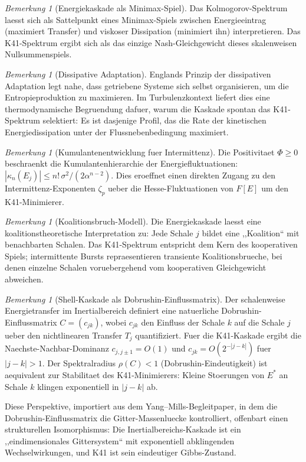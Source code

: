 \documentclass[12pt,a4paper]{article}
\theoremstyle{definition}
\theoremstyle{plain}
\theoremstyle{remark}
\newtheorem{remark}[definition]{Bemerkung}
\begin{document}
\begin{remark}[Energiekaskade als Minimax-Spiel]
Das Kolmogorov-Spektrum laesst sich als Sattelpunkt eines Minimax-Spiels zwischen Energieeintrag (maximiert Transfer) und viskoser Dissipation (minimiert ihn) interpretieren. Das K41-Spektrum ergibt sich als das einzige Nash-Gleichgewicht dieses skalenweisen Nullsummenspiels.
\end{remark}

\begin{remark}[Dissipative Adaptation]
Englands Prinzip der dissipativen Adaptation legt nahe, dass getriebene Systeme sich selbst organisieren, um die Entropieproduktion zu maximieren. Im Turbulenzkontext liefert dies eine thermodynamische Begruendung dafuer, warum die Kaskade spontan das K41-Spektrum selektiert: Es ist dasjenige Profil, das die Rate der kinetischen Energiedissipation unter der Flussnebenbedingung maximiert.
\end{remark}

\begin{remark}[Kumulantenentwicklung fuer Intermittenz]
Die Positivitaet $\Phi \geq 0$ beschraenkt die Kumulantenhierarchie der Energiefluktuationen: $|\kappa_n(E_j)| \leq n! \, \sigma^2 / (2\alpha^{n-2})$. Dies eroeffnet einen direkten Zugang zu den Intermittenz-Exponenten $\zeta_p$ ueber die Hesse-Fluktuationen von $F[E]$ um den K41-Minimierer.
\end{remark}

\begin{remark}[Koalitionsbruch-Modell]
Die Energiekaskade laesst eine koalitionstheoretische Interpretation zu: Jede Schale $j$ bildet eine ,,Koalition`` mit benachbarten Schalen. Das K41-Spektrum entspricht dem Kern des kooperativen Spiels; intermittente Bursts repraesentieren transiente Koalitionsbrueche, bei denen einzelne Schalen voruebergehend vom kooperativen Gleichgewicht abweichen.
\end{remark}


\begin{remark}[Shell-Kaskade als Dobrushin-Einflussmatrix]
\label{rem:dobrushin-cascade}
Der schalenweise Energietransfer im Inertialbereich definiert eine natuerliche Dobrushin-Einflussmatrix $C = (c_{jk})$, wobei $c_{jk}$ den Einfluss der Schale $k$ auf die Schale $j$ ueber den nichtlinearen Transfer $T_j$ quantifiziert. Fuer die K41-Kaskade ergibt die Naechste-Nachbar-Dominanz $c_{j,j\pm 1} = O(1)$ und $c_{jk} = O(2^{-|j-k|})$ fuer $|j-k| > 1$. Der Spektralradius $\rho(C) < 1$ (Dobrushin-Eindeutigkeit) ist aequivalent zur Stabilitaet des K41-Minimierers: Kleine Stoerungen von $E^*$ an Schale $k$ klingen exponentiell in $|j-k|$ ab.

Diese Perspektive, importiert aus dem Yang--Mills-Begleitpaper, in dem die Dobrushin-Einflussmatrix die Gitter-Massenluecke kontrolliert, offenbart einen strukturellen Isomorphismus: Die Inertialbereichs-Kaskade ist ein ,,eindimensionales Gittersystem`` mit exponentiell abklingenden Wechselwirkungen, und K41 ist sein eindeutiger Gibbs-Zustand.
\end{remark}
\end{document}
